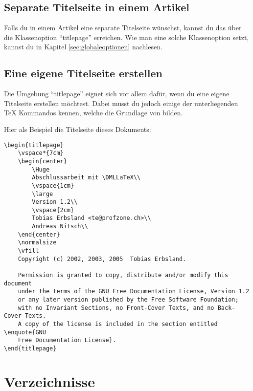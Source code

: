 \subsection{Separate Titelseite in einem Artikel}
\label{sec:separatetitelseite}

Falls du in einem Artikel eine separate Titelseite wünschst, kannst du das über die Klassenoption \enquote{titlepage} erreichen. Wie man eine solche Klassenoption setzt, kannst du in Kapitel \ref{sec:globaleoptionen} nachlesen.

\subsection{Eine eigene Titelseite erstellen}

Die Umgebung \enquote{titlepage} eignet sich vor allem dafür, wenn du eine eigene Titelseite erstellen möchtest. Dabei musst du jedoch einige der unterliegenden {\rmfamily\TeX} Kommandos kennen, welche die Grundlage von \DMLLaTeX{} bilden.

Hier als Beispiel die Titelseite dieses Dokuments:
\begin{lstlisting}[frame=tb, caption=Titelseite dieses Dokuments]
\begin{titlepage}
	\vspace*{7cm}
	\begin{center}
		\Huge
		Abschlussarbeit mit \DMLLaTeX\\
		\vspace{1cm}
		\large
		Version 1.2\\
		\vspace{2cm}
		Tobias Erbsland <te@profzone.ch>\\
		Andreas Nitsch\\
	\end{center}
	\normalsize
	\vfill
	Copyright (c) 2002, 2003, 2005  Tobias Erbsland.

	Permission is granted to copy, distribute and/or modify this document
	under the terms of the GNU Free Documentation License, Version 1.2
	or any later version published by the Free Software Foundation;
	with no Invariant Sections, no Front-Cover Texts, and no Back-Cover Texts.
	A copy of the license is included in the section entitled \enquote{GNU
	Free Documentation License}.
\end{titlepage}
\end{lstlisting}

\section{Verzeichnisse}

